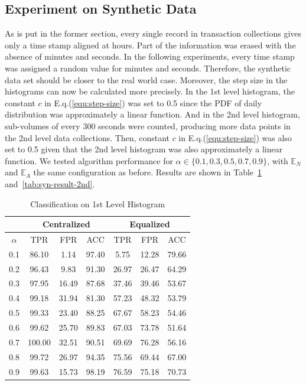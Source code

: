 \documentclass[10pt,conference,letterpaper]{IEEEtran}
\begin{document}
		\subsection{Experiment on Synthetic Data}\label{sec:exp-synthetic}
			As is put in the former section, every single record in transaction collections gives only a time stamp aligned at hours. Part of the information was erased with the absence of minutes and seconds. In the following experiments, every time stamp was assigned a random value for minutes and seconds. Therefore, the synthetic data set should be closer to the real world case. Moreover, the step size in the histograms can now be calculated more precisely. In the 1st level histogram, the constant $c$ in E.q.(\ref{equ:step-size}) was set to 0.5 since the PDF of daily distribution was approximately a linear function. And in the 2nd level histogram, sub-volumes of every 300 seconds were counted, producing more data points in the 2nd level data collections. Then, constant $c$ in E.q.(\ref{equ:step-size}) was also set to 0.5 given that the 2nd level histogram was also approximately a linear function.
			We tested algorithm performance for $\alpha \in \{0.1, 0.3, 0.5, 0.7, 0.9\}$, with $\mathbb{E}_N$ and $\mathbb{E}_A$ the same configuration as before. Results are shown in Table~\ref{tab:syn-result-1st} and~\ref{tab:syn-result-2nd}.
			
			\begin{table}[!ht]
				\centering
				\caption{Classification on 1st Level Histogram}
				\label{tab:syn-result-1st}
				\begin{tabular}{|c|c|c|c|c|c|c|}
					\hline
					& \multicolumn{3}{c|}{Centralized} & \multicolumn{3}{c|}{Equalized}\\
					\hline
					$\alpha$ & TPR & FPR & ACC & TPR & FPR & ACC \\ 
					\hline
					0.1 & 86.10 & 1.14 & 97.40 & 5.75 & 12.28 & 79.66 \\ 
					\hline
					0.2 & 96.43 & 9.83 & 91.30 & 26.97 & 26.47 & 64.29 \\ 
					\hline
					0.3 & 97.95 & 16.49 & 87.68 & 37.46 & 39.46 & 53.67 \\ 
					\hline
					0.4 & 99.18 & 31.94 & 81.30 & 57.23 & 48.32 & 53.79 \\ 
					\hline
					0.5 & 99.33 & 23.40 & 88.25 & 67.67 & 58.23 & 54.46 \\ 
					\hline
					0.6 & 99.62 & 25.70 & 89.83 & 67.03 & 73.78 & 51.64 \\ 
					\hline
					0.7 & 100.00 & 32.51 & 90.51 & 69.69 & 76.28 & 56.16 \\ 
					\hline
					0.8 & 99.72 & 26.97 & 94.35 & 75.56 & 69.44 & 67.00 \\ 
					\hline
					0.9 & 99.63 & 15.73 & 98.19 & 76.59 & 75.18 & 70.73\\
					\hline
				\end{tabular} 
			\end{table}
			
\end{document}
